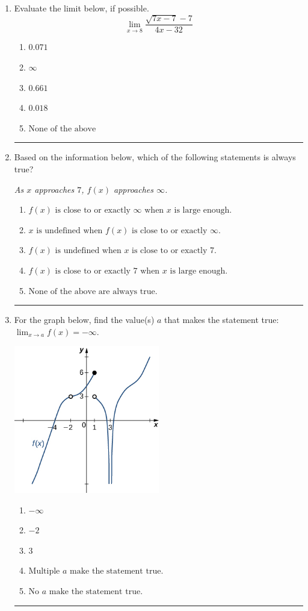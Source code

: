 \documentclass[14pt]{extbook}
\newcommand{\litem}[1]{\item#1\hspace*{-1cm}\rule{\textwidth}{0.4pt}}
\begin{document}
\begin{enumerate}
\litem{
Evaluate the limit below, if possible.\[ \lim_{x \rightarrow 8} \frac{\sqrt{7x - 7} - 7}{4x - 32} \]\begin{enumerate}[label=\Alph*.]
\item \( 0.071 \)
\item \( \infty \)
\item \( 0.661 \)
\item \( 0.018 \)
\item \( \text{None of the above} \)

\end{enumerate} }
\litem{
Based on the information below, which of the following statements is always true?
\begin{center}
    \textit{ As $x$ approaches $7$, $f(x)$ approaches $\infty$. }
\end{center}
\begin{enumerate}[label=\Alph*.]
\item \( f(x) \text{ is close to or exactly } \infty \text{ when } x \text{ is large enough}. \)
\item \( x \text{ is undefined when } f(x) \text{ is close to or exactly } \infty. \)
\item \( f(x) \text{ is undefined when } x \text{ is close to or exactly } 7. \)
\item \( f(x) \text{ is close to or exactly } 7 \text{ when } x \text{ is large enough}. \)
\item \( \text{None of the above are always true.} \)

\end{enumerate} }
\litem{
For the graph below, find the value(s) $a$ that makes the statement true: $ \displaystyle \lim_{x \rightarrow a} f(x) = -\infty$.
\begin{center}
    \includegraphics[width=0.5\textwidth]{../Figures/evaluateLimitGraphicallyCopyB.png}
\end{center}
\begin{enumerate}[label=\Alph*.]
\item \( -\infty \)
\item \( -2 \)
\item \( 3 \)
\item \( \text{Multiple } a \text{ make the statement true}. \)
\item \( \text{No } a \text{ make the statement true}. \)


\end{enumerate}}
\end{enumerate}
\end{document}
